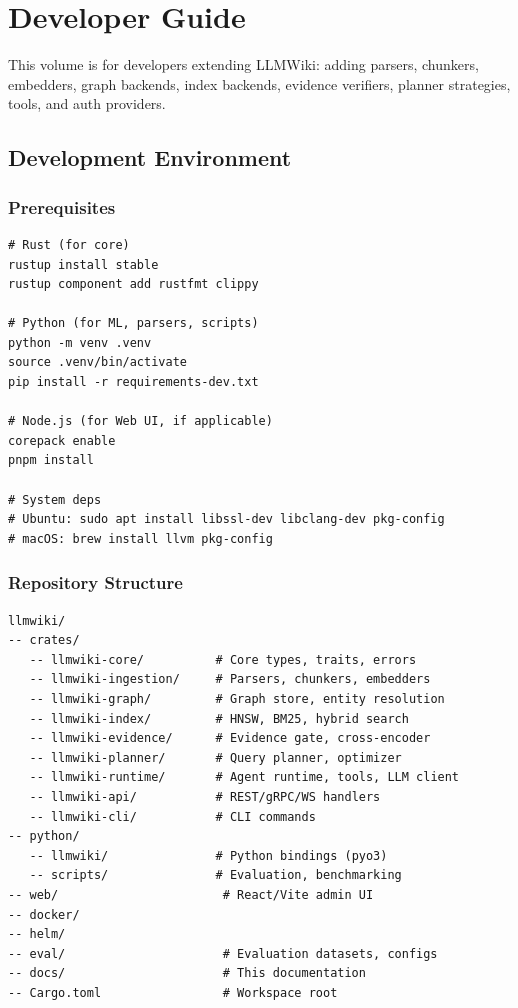 ﻿%
\chapter{Developer Guide}
\label{cha:dev-guide}

This volume is for developers extending LLMWiki: adding parsers, chunkers, embedders, graph backends, index backends, evidence verifiers, planner strategies, tools, and auth providers.

\section{Development Environment}
\label{sec:dev:env}

\subsection{Prerequisites}
\label{sec:dev:prereqs}

\begin{verbatim}
# Rust (for core)
rustup install stable
rustup component add rustfmt clippy

# Python (for ML, parsers, scripts)
python -m venv .venv
source .venv/bin/activate
pip install -r requirements-dev.txt

# Node.js (for Web UI, if applicable)
corepack enable
pnpm install

# System deps
# Ubuntu: sudo apt install libssl-dev libclang-dev pkg-config
# macOS: brew install llvm pkg-config
\end{verbatim}

\subsection{Repository Structure}
\label{sec:dev:structure}

\begin{verbatim}
llmwiki/
-- crates/
   -- llmwiki-core/          # Core types, traits, errors
   -- llmwiki-ingestion/     # Parsers, chunkers, embedders
   -- llmwiki-graph/         # Graph store, entity resolution
   -- llmwiki-index/         # HNSW, BM25, hybrid search
   -- llmwiki-evidence/      # Evidence gate, cross-encoder
   -- llmwiki-planner/       # Query planner, optimizer
   -- llmwiki-runtime/       # Agent runtime, tools, LLM client
   -- llmwiki-api/           # REST/gRPC/WS handlers
   -- llmwiki-cli/           # CLI commands
-- python/
   -- llmwiki/               # Python bindings (pyo3)
   -- scripts/               # Evaluation, benchmarking
-- web/                       # React/Vite admin UI
-- docker/
-- helm/
-- eval/                      # Evaluation datasets, configs
-- docs/                      # This documentation
-- Cargo.toml                 # Workspace root
\end{verbatim}


